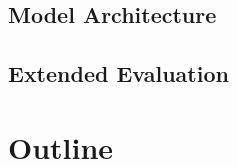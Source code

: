 \subsection{Model Architecture}
\label{ch:intro-contributions-modelArchitecture}


\subsection*{Extended Evaluation}



\section{Outline}
\label{ch:intro-outline}
